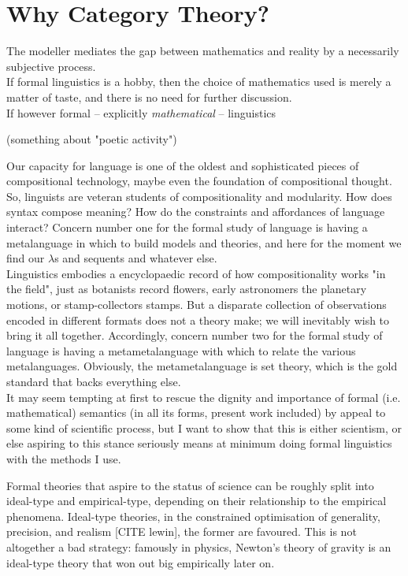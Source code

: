 \section{Why Category Theory?}

The modeller mediates the gap between mathematics and reality by a necessarily subjective process.\\

If formal linguistics is a hobby, then the choice of mathematics used is merely a matter of taste, and there is no need for further discussion.\\

If however formal -- explicitly \emph{mathematical} -- linguistics 

(something about "poetic activity")

Our capacity for language is one of the oldest and sophisticated pieces of compositional technology, maybe even the foundation of compositional thought. So, linguists are veteran students of compositionality and modularity. How does syntax compose meaning? How do the constraints and affordances of language interact? Concern number one for the formal study of language is having a metalanguage in which to build models and theories, and here for the moment we find our $\lambda$s and sequents and whatever else.\\

Linguistics embodies a encyclopaedic record of how compositionality works "in the field", just as botanists record flowers, early astronomers the planetary motions, or stamp-collectors stamps. But a disparate collection of observations encoded in different formats does not a theory make; we will inevitably wish to bring it all together. Accordingly, concern number two for the formal study of language is having a metametalanguage with which to relate the various metalanguages. Obviously, the metametalanguage is set theory, which is the gold standard that backs everything else.\\

It may seem tempting at first to rescue the dignity and importance of formal (i.e. mathematical) semantics (in all its forms, present work included) by appeal to some kind of scientific process, but I want to show that this is either scientism, or else aspiring to this stance seriously means at minimum doing formal linguistics with the methods I use.

Formal theories that aspire to the status of science can be roughly split into ideal-type and empirical-type, depending on their relationship to the empirical phenomena. Ideal-type theories, in the constrained optimisation of generality, precision, and realism [CITE lewin], the former are favoured. This is not altogether a bad strategy: famously in physics, Newton's theory of gravity is an ideal-type theory that won out big empirically later on.

